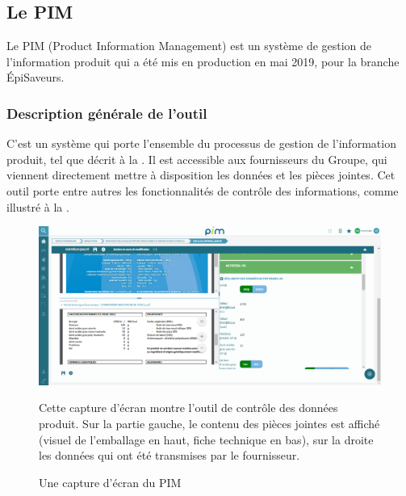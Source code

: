             \subsection{Le PIM}
            \label{PIM}

            Le PIM (Product Information Management) est un système de gestion de l'information produit qui a été mis en production en mai 2019, pour la branche \'{E}piSaveurs.

                \subsubsection{Description générale de l'outil}

                C'est un système qui porte l'ensemble du processus de gestion de l'information produit, tel que décrit à la .
                Il est accessible aux fournisseurs du Groupe, qui viennent directement mettre à disposition les données et les pièces jointes.
                Cet outil porte entre autres les fonctionnalités de contrôle des informations, comme illustré à la .

                \begin{figure}[htpb]
                    \begin{center}
                    \includegraphics[width=\linewidth]{img/Ecran PIM.png}
                    \end{center}
                    Cette capture d'écran montre l'outil de contrôle des données produit. Sur la partie gauche, le contenu des pièces jointes est affiché (visuel de l'emballage en haut, fiche technique en bas), sur la droite les données qui ont été transmises par le fournisseur.
                    \caption{Une capture d'écran du PIM}
                    \label{fig:ecran_PIM}
                \end{figure} 


